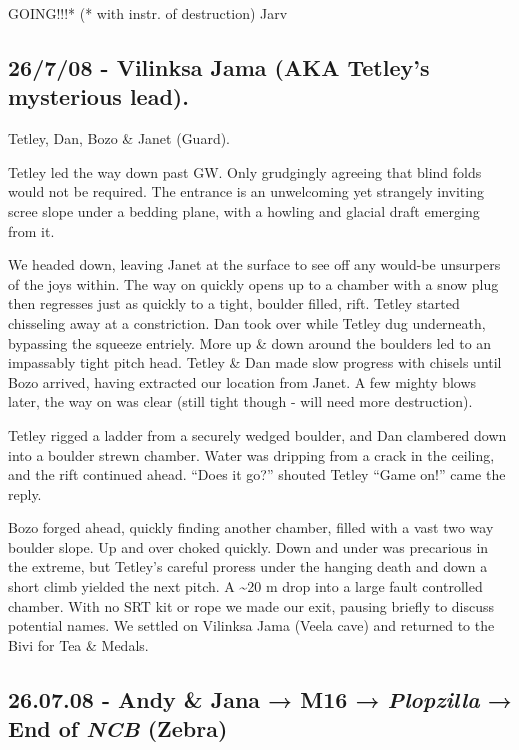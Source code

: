 GOING!!!* (* with instr. of destruction) Jarv

\hypertarget{vilinksa-jama-aka-tetleys-mysterious-lead.}{%
\subsection{26/7/08 - Vilinksa Jama (AKA Tetley's mysterious
lead).}\label{vilinksa-jama-aka-tetleys-mysterious-lead.}}

Tetley, Dan, Bozo \& Janet (Guard).

Tetley led the way down past GW. Only grudgingly agreeing that blind
folds would not be required. The entrance is an unwelcoming yet
strangely inviting scree slope under a bedding plane, with a howling and
glacial draft emerging from it.

We headed down, leaving Janet at the surface to see off any would-be
unsurpers of the joys within. The way on quickly opens up to a chamber
with a snow plug then regresses just as quickly to a tight, boulder
filled, rift. Tetley started chisseling away at a constriction. Dan took
over while Tetley dug underneath, bypassing the squeeze entriely. More
up \& down around the boulders led to an impassably tight pitch head.
Tetley \& Dan made slow progress with chisels until Bozo arrived, having
extracted our location from Janet. A few mighty blows later, the way on
was clear (still tight though - will need more destruction).

Tetley rigged a ladder from a securely wedged boulder, and Dan clambered
down into a boulder strewn chamber. Water was dripping from a crack in
the ceiling, and the rift continued ahead. ``Does it go?'' shouted
Tetley ``Game on!'' came the reply.

Bozo forged ahead, quickly finding another chamber, filled with a vast
two way boulder slope. Up and over choked quickly. Down and under was
precarious in the extreme, but Tetley's careful proress under the
hanging death and down a short climb yielded the next pitch. A
\textasciitilde20 m drop into a large fault controlled chamber. With no
SRT kit or rope we made our exit, pausing briefly to discuss potential
names. We settled on Vilinksa Jama (Veela cave) and returned to the Bivi
for Tea \& Medals. 

\hypertarget{andy-jana-m16-plopzilla-end-of-ncb-zebra}{%
\subsection{\texorpdfstring{26.07.08 - Andy \& Jana → M16 →
\emph{Plopzilla} → End of \emph{NCB}
(Zebra)}{26.07.08 - Andy \& Jana → M16 → Plopzilla → End of NCB (Zebra)}}\label{andy-jana-m16-plopzilla-end-of-ncb-zebra}}


